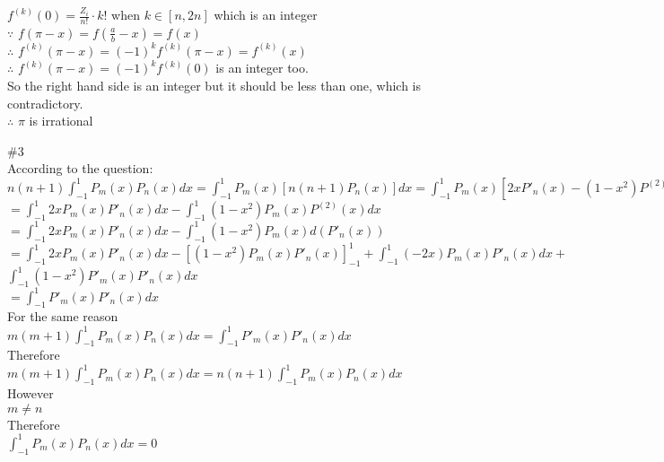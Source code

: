 \documentclass{article}
\begin{document}
\hskip 1.1cm $\displaystyle f^{(k)}(0) = \frac{Z_i}{n!} \cdot k!$ when $k \in [n, 2n]$ which is an integer\\

$\because$ \qquad $f(\pi - x) = f(\frac{a}{b} - x) = f(x)$\\

$\therefore$ \qquad $f^{(k)}(\pi - x) = (-1)^kf^{(k)}(\pi - x) = f^{(k)}(x)$\\

$\therefore$ \qquad $f^{(k)}(\pi - x) = (-1)^k f^{(k)}(0)$ is an integer too.\\

So the right hand side is an integer but it should be less than one, which is contradictory.\\

$\therefore$ \qquad $\pi$ is irrational\\

\vskip 3cm

\textcolor[rgb]{0.00,0.00,0.50}{\#3}\\

According to the question:\\

$\displaystyle n(n+1) \int_{-1}^1 P_m(x) P_n(x) dx = \int_{-1}^1 P_m(x)[n(n+1)P_n(x)] dx = \int_{-1}^1 P_m(x)[2xP'_n(x) - (1-x^2)P^{(2)}(x)] dx$\\

\hskip 4.35cm $\displaystyle = \int_{-1}^1 2x P_m(x)P'_n(x) dx - \int_{-1}^1 (1-x^2) P_m(x) P^{(2)}(x) dx$\\

\hskip 4.35cm $\displaystyle = \int_{-1}^1 2x P_m(x) P'_n(x) dx - \int_{-1}^1 (1-x^2) P_m(x) d(P'_n(x))$\\

\hskip 4.35cm $\displaystyle = \int_{-1}^1 2x P_m(x) P'_n(x) dx - [(1-x^2) P_m(x) P'_n(x)]_{-1}^1 + \int_{-1}^1 (-2x) P_m(x) P'_n(x) dx +$\\

\hskip 4.69cm $\displaystyle \int_{-1}^1 (1-x^2) P'_m(x) P'_n(x) dx$\\

\hskip 4.35cm $\displaystyle = \int_{-1}^1 P'_m(x) P'_n(x) dx$\\

For the same reason\\

$\displaystyle m(m+1) \int_{-1}^1 P_m(x) P_n(x) dx = \int_{-1}^1 P'_m(x) P'_n(x) dx$\\

Therefore\\

$\displaystyle m(m+1) \int_{-1}^1 P_m(x) P_n(x) dx = n(n+1) \int_{-1}^1 P_m(x) P_n(x) dx$\\

However\\

$m \neq n$\\

Therefore\\

$\displaystyle \int_{-1}^1 P_m(x) P_n(x) dx = 0$\\

\vskip 3cm
\end{document}
